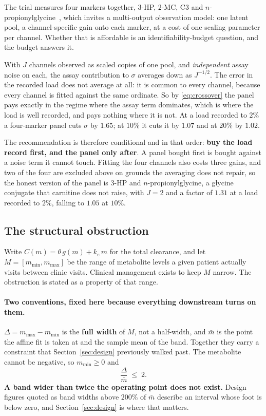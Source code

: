 \begin{remark}
\label{rem:panel}
The trial measures four markers together, 3-HP, 2-MC, C3 and
$n$-propionylglycine~\cite{trial_phase12}, which invites a multi-output observation model:
one latent pool, a channel-specific gain onto each marker, at a cost of one scaling
parameter per channel. Whether that is affordable is an identifiability-budget question, and
the budget answers it.

With $J$ channels observed as scaled copies of one pool, and \emph{independent} assay noise
on each, the assay contribution to $\sigma$ averages down as $J^{-1/2}$. The error in the
recorded load does not average at all: it is common to every channel, because every channel
is fitted against the same ordinate. So by \eqref{eq:crossover} the panel pays exactly in
the regime where the assay term dominates, which is where the load is well recorded, and
pays nothing where it is not. At a load recorded to $2\%$ a four-marker panel cuts $\sigma$
by $1.65$; at $10\%$ it cuts it by $1.07$ and at $20\%$ by $1.02$.

The recommendation is therefore conditional and in that order: \textbf{buy the load record
first, and the panel only after}. A panel bought first is bought against a noise term it
cannot touch. Fitting the four channels also costs three gains, and two of the four are
excluded above on grounds the averaging does not repair, so the honest version of the panel
is 3-HP and $n$-propionylglycine, a glycine conjugate that carnitine does not raise, with
$J = 2$ and a factor of $1.31$ at a load recorded to $2\%$, falling to $1.05$ at $10\%$.
\end{remark}

\subsection{The structural obstruction}

Write $C(m) = \theta\, g(m) + k_e\, m$ for the total clearance, and let
$M = [m_{\min}, m_{\max}]$ be the range of metabolite levels a given patient actually
visits between clinic visits. Clinical management exists to keep $M$ narrow. The
obstruction is stated as a property of that range.

\paragraph{Two conventions, fixed here because everything downstream turns on them.}
$\Delta = m_{\max} - m_{\min}$ is the \textbf{full width} of $M$, not a half-width, and
$\bar m$ is the point the affine fit is taken at and the sample mean of the band. Together
they carry a constraint that Section~\ref{sec:design} previously walked past. The
metabolite cannot be negative, so $m_{\min} \ge 0$ and
\begin{equation}
\frac{\Delta}{\bar m} \;\le\; 2 .
\label{eq:bandceiling}
\end{equation}
\textbf{A band wider than twice the operating point does not exist.} Design figures quoted
as band widths above $200\%$ of $\bar m$ describe an interval whose foot is below zero, and
Section~\ref{sec:design} is where that matters.

